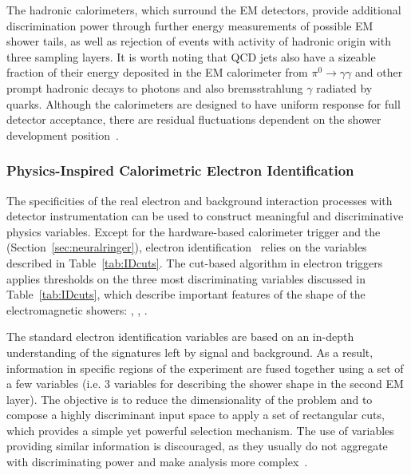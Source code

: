 The hadronic calorimeters, which surround the EM detectors,
provide additional discrimination power through further energy measurements of
possible EM shower tails, as well as rejection of events with activity of
hadronic origin with three sampling layers. It is worth noting that QCD jets also have a sizeable fraction of their energy deposited in the EM calorimeter from $\pi^{0}\rightarrow\gamma\gamma$
and other prompt hadronic decays to photons and also bremsstrahlung $\gamma$ radiated by quarks.
Although the calorimeters are designed 
to have uniform response for full detector acceptance, there are residual fluctuations 
dependent on the shower development position~\cite{Wigmans2017}.



\subsubsection{Physics-Inspired Calorimetric Electron Identification}\label{ssec:std_variables}

The specificities of the real electron and background interaction processes with
detector instrumentation can be used to construct meaningful and discriminative physics variables. Except for the hardware-based calorimeter trigger
and the \rnn (Section~\ref{sec:neuralringer}), electron
identification~\cite{atlas_electron_id_offline} relies on the variables
described in Table~\ref{tab:IDcuts}. 
The cut-based algorithm in electron
triggers applies thresholds on the three most discriminating variables discussed in Table~\ref{tab:IDcuts}, which describe important features of the shape of the electromagnetic showers: \reta{}, \eratio{}, \rhadone{}.




  
The standard electron identification variables are based on an in-depth
understanding of the signatures left by signal and background.  As a result, information in specific regions of the experiment
are fused together using a set of a few variables (i.e. 3 variables for describing the shower shape in the second EM layer). The objective is to reduce the dimensionality of the problem and to compose a highly discriminant input space to apply a set of rectangular cuts, which provides a simple yet powerful selection mechanism. The use of variables providing similar information is discouraged, as they usually do not aggregate with
discriminating power and make analysis more
complex~\cite{aaboud2019electron}.

